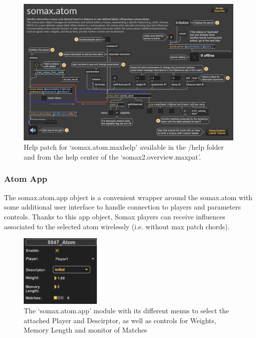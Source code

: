 \begin{figure}[H]
    \centering        
 	\includegraphics[width=1\textwidth, keepaspectratio]{img/atom_help.png}
    \caption{Help patch for `somax.atom.maxhelp' available in the /help folder and from the help center of the `somax2.overview.maxpat'.}
    \label{fig:atom_help}
\end{figure}

\subsubsection{Atom App}

The somax.atom.app object is a convenient wrapper around the somax.atom with some additional user interface to handle connection to players and parameters controls. Thanks to this app object, Somax players can receive influences associated to the selected atom wirelessly (i.e. without max patch chords).

\begin{figure}[H]
    \centering        
 	\includegraphics[width=0.35\textwidth, keepaspectratio]{img/atom_app.png}
    \caption{The `somax.atom.app' module with its different menus to select the attached Player and Descirptor, as well as controls for Weights, Memory Length and monitor of Matches}
    \label{fig:atom_app}
\end{figure}

